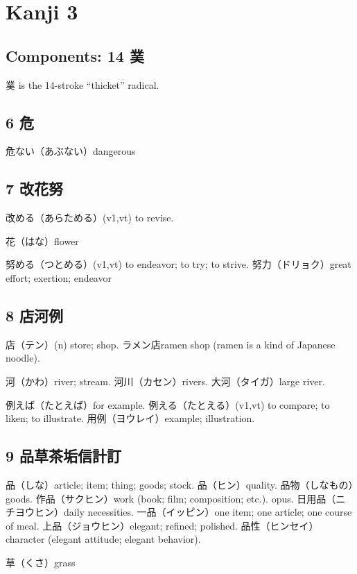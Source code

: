 \chapter{Kanji 3}

\section{Components: 14 菐}

菐 is the 14-stroke ``thicket'' radical.

\section{6 危}

危ない（あぶない）dangerous

\section{7 改花努}

改める（あらためる）(v1,vt) to revise.

花（はな）flower

努める（つとめる）(v1,vt) to endeavor; to try; to strive.
努力（ドリョク）great effort; exertion; endeavor

\section{8 店河例}

店（テン）(n) store; shop.
ラメン店ramen shop (ramen is a kind of Japanese noodle).

河（かわ）river; stream.
河川（カセン）rivers.
大河（タイガ）large river.

例えば（たとえば）for example.
例える（たとえる）(v1,vt)
to compare; to liken; to illustrate.
用例（ヨウレイ）example; illustration.

\section{9 品草茶垢信計訂}

品（しな）article; item; thing; goods; stock.
品（ヒン）quality.
品物（しなもの）goods.
作品（サクヒン）work (book; film; composition; etc.). opus.
日用品（ニチヨウヒン）daily necessities.
一品（イッピン）one item; one article; one course of meal.
上品（ジョウヒン）elegant; refined; polished.
品性（ヒンセイ）character (elegant attitude; elegant behavior).

草（くさ）grass


